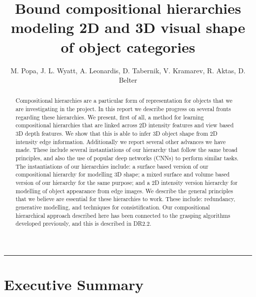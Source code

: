 \documentclass[a4paper,11pt,pdf]{pacmanreport}
\title{Bound compositional hierarchies modeling 2D and 3D visual shape of object categories}
\author{M. Popa, J. L. Wyatt, A. Leonardis, D. Tabernik, V. Kramarev, R. Aktas, D. Belter}
\begin{document}
\maketitle

\begin{abstract}
\noindent Compositional hierarchies are a particular form of representation for objects that we are investigating in the project. In this report we describe progress on several fronts regarding these hierarchies. We present, first of all, a method for learning compositional hierarchies that are linked across 2D intensity features and view based 3D depth features. We show that this is able to infer 3D object shape from 2D intensity edge information. Additionally we report several other advances we have made. These include several instantiations of our hierarchy that follow the same broad principles, and also the use of popular deep networks (CNNs) to perform similar tasks. The instantiations of our hierarchies include: a surface based version of our compositional hierarchy for modelling 3D shape; a mixed surface and volume based version of our hierarchy for the same purpose; and a 2D intensity version hierarchy for modelling of object appearance from edge images. We describe the general principles that we believe are essential for these hierarchies to work. These include: redundancy, generative modelling, and techniques for consistification. Our compositional hierarchical approach described here has been connected to the grasping algorithms developed previously, and this is described in DR2.2.
\end{abstract}


\vspace{.2em}
\hrule

\footnotesize

\tableofcontents

\normalsize

\newpage

\section*{Executive Summary}

\end{document}
